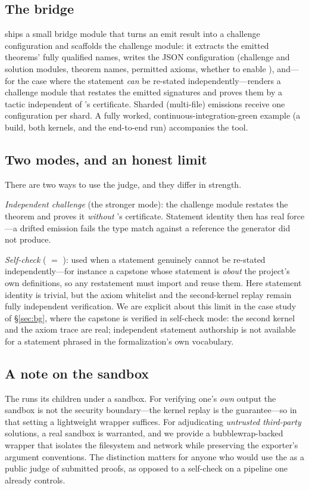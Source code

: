 \subsection{The bridge}

\Telperion{} ships a small bridge module that turns an emit result into a
\Comparator{} challenge configuration and scaffolds the challenge module: it
extracts the emitted theorems' fully qualified names, writes the JSON configuration
(challenge and solution modules, theorem names, permitted axioms, whether to enable
\nanoda), and---for the case where the statement \emph{can} be re-stated
independently---renders a challenge module that restates the emitted signatures and
proves them by a tactic independent of \Telperion's certificate. Sharded
(multi-file) emissions receive one configuration per shard. A fully worked,
continuous-integration-green example (a \Mathlib{} build, both kernels, and the
end-to-end run) accompanies the tool.

\subsection{Two modes, and an honest limit}

There are two ways to use the judge, and they differ in strength.

\emph{Independent challenge} (the stronger mode): the challenge module restates the
theorem and proves it \emph{without} \Telperion's certificate. Statement identity
then has real force---a drifted emission fails the type match against a reference
the generator did not produce.

\emph{Self-check} ( $=$ ): used when
a statement genuinely cannot be re-stated independently---for instance a capstone
whose statement is \emph{about} the project's own definitions, so any restatement
must import and reuse them. Here statement identity is trivial, but the axiom
whitelist and the second-kernel replay remain fully independent verification. We
are explicit about this limit in the case study of \S\ref{sec:bg}, where the
capstone is verified in self-check mode: the second kernel and the axiom trace are
real; independent statement authorship is not available for a statement phrased in
the formalization's own vocabulary.

\subsection{A note on the sandbox}

The \Comparator{} runs its children under a sandbox. For verifying one's
\emph{own} output the sandbox is not the security boundary---the kernel replay is
the guarantee---so in that setting a lightweight wrapper suffices. For adjudicating
\emph{untrusted third-party} solutions, a real sandbox is warranted, and we provide
a bubblewrap-backed wrapper that isolates the filesystem and network while
preserving the exporter's argument conventions. The distinction matters for anyone
who would use the \Comparator{} as a public judge of submitted proofs, as opposed
to a self-check on a pipeline one already controls.

